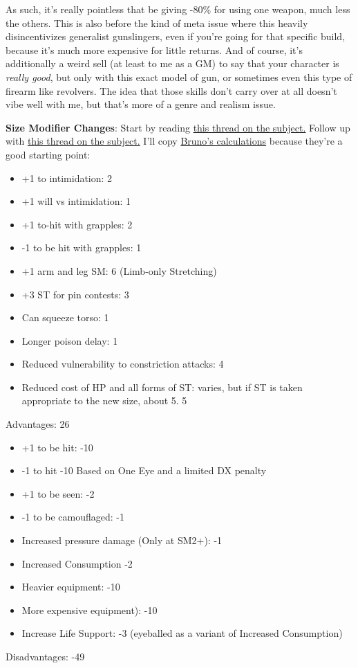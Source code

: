 \begin{multicols*}{2}
	As such, it's really pointless that be giving -80\% for using one weapon, much less the others. This is also before the kind of meta issue where this heavily disincentivizes generalist gunslingers, even if you're going for that specific build,  because it's much more expensive for little returns. And of course, it's additionally a weird sell (at least to me as a GM) to say that your character is \textit{really good}, but only with this exact model of gun, or sometimes even this type of firearm like revolvers. The idea that those skills don't carry over at all doesn't vibe well with me, but that's more of a genre and realism issue.
	
	\textbf{Size Modifier Changes}: Start by reading \textcolor{blue}{\href{https://forums.sjgames.com/showthread.php?t=85702}{this thread on the subject.}} Follow up with \textcolor{blue}{\href{https://www.ravensnpennies.com/gurps101-deconstructing-size-modifier/}{this thread on the subject.}} I'll copy \textcolor{blue}{\href{https://forums.sjgames.com/showpost.php?p=1289787&postcount=128}{Bruno's calculations}} because they're a good starting point:
	
	\begin{itemize}
		\itemsep 0pt
		\item 	+1 to intimidation: 2
		\item 	+1 will vs intimidation: 1
		\item 	+1 to-hit with grapples: 2
		\item 	-1 to be hit with grapples: 1
		\item 	+1 arm and leg SM: 6 (Limb-only Stretching)
		\item 	+3 ST for pin contests: 3
		\item 	Can squeeze torso: 1
		\item 	Longer poison delay: 1
		\item Reduced vulnerability to constriction attacks: 4
		\item Reduced cost of HP and all forms of ST: varies, but if ST is taken appropriate to the new size, about 5. 5
	\end{itemize}
	Advantages: 26
	
	\begin{itemize}
		\itemsep 0pt
		\item 	+1 to be hit: -10
		\item 	-1 to hit -10 Based on One Eye and a limited DX penalty
		\item 	+1 to be seen: -2
		\item 	-1 to be camouflaged: -1
		\item 	Increased pressure damage (Only at SM2+): -1
		\item 	Increased Consumption -2
		\item 	Heavier equipment: -10
		\item 	More expensive equipment): -10
		\item 	Increase Life Support: -3 (eyeballed as a variant of Increased Consumption)
	\end{itemize}
	Disadvantages: -49
	

\end{multicols*}
